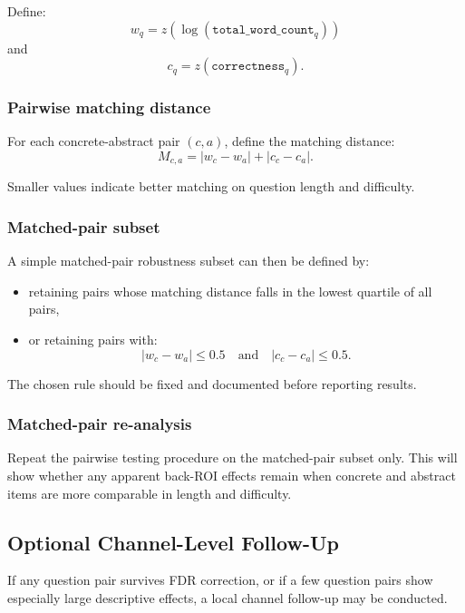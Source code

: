 \documentclass[11pt]{article}
\begin{document}
Define:
\begin{equation}
w_q = z\!\left(\log(\texttt{total\_word\_count}_q)\right)
\end{equation}
and
\begin{equation}
c_q = z(\texttt{correctness}_q).
\end{equation}

\subsubsection{Pairwise matching distance}
For each concrete-abstract pair \((c,a)\), define the matching distance:
\begin{equation}
M_{c,a}
=
|w_c - w_a| + |c_c - c_a|.
\end{equation}

Smaller values indicate better matching on question length and difficulty.

\subsubsection{Matched-pair subset}
A simple matched-pair robustness subset can then be defined by:
\begin{itemize}
    \item retaining pairs whose matching distance falls in the lowest quartile of all pairs,
    \item or retaining pairs with:
    \begin{equation}
    |w_c - w_a| \leq 0.5
    \quad \text{and} \quad
    |c_c - c_a| \leq 0.5.
    \end{equation}
\end{itemize}

The chosen rule should be fixed and documented before reporting results.

\subsubsection{Matched-pair re-analysis}
Repeat the pairwise testing procedure on the matched-pair subset only.
This will show whether any apparent back-ROI effects remain when concrete and abstract items are
more comparable in length and difficulty.

\subsection{Optional Channel-Level Follow-Up}
If any question pair survives FDR correction, or if a few question pairs show especially large
descriptive effects, a local channel follow-up may be conducted.
\end{document}
